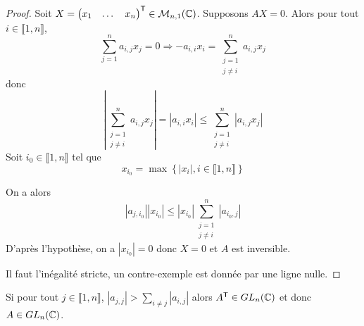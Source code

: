 \begin{proof}
    Soit $X=\begin{pmatrix}
        x_{1}&\dots&x_{n}
    \end{pmatrix}^{\mathsf{T}}\in\mathcal{M}_{n,1}(\mathbb{C})$. Supposons $AX=0$. Alors pour tout $i\in\llbracket1,n\rrbracket$,
    \begin{equation}
        \sum_{j=1}^{n}a_{i,j}x_{j}=0\Rightarrow -a_{i,i}x_{i}=\sum_{\substack{j=1\\j\neq i}}^{n}a_{i,j}x_{j}
    \end{equation}
    donc 
    \begin{equation}
        \left\lvert\sum_{\substack{j=1\\j\neq i}}^{n}a_{i,j}x_{j}\right\rvert=\left\lvert a_{i,i}x_{i}\right\rvert\leqslant\sum_{\substack{j=1\\j\neq i}}^{n}\left\lvert a_{i,j}x_{j}\right\rvert
    \end{equation}
    Soit $i_{0}\in\llbracket1,n\rrbracket$ tel que 
    \begin{equation}
        x_{i_{0}}=\max\left\lbrace\left\lvert x_{i}\right\rvert,i\in\llbracket1,n\rrbracket\right\rbrace
    \end{equation}

    On a alors 
    \begin{equation}
        \left\lvert a_{j,i_{0}}\right\rvert\left\lvert x_{i_{0}}\right\rvert\leqslant \left\lvert x_{i_{0}}\right\rvert\sum_{\substack{j=1\\j\neq i}}^{n}\left\lvert a_{i_{0},j}\right\rvert
    \end{equation}
    D'après l'hypothèse, on a $\left\lvert x_{i_{0}}\right\rvert=0$ donc $X=0$ et $A$ est inversible.

    Il faut l'inégalité stricte, un contre-exemple est donnée par une ligne nulle.
\end{proof}

\begin{remark}
    Si pour tout $j\in\llbracket1,n\rrbracket$, $\left\lvert a_{j,j}\right\rvert>\sum_{i\neq j}\left\lvert a_{i,j}\right\rvert$ alors $A^{\mathsf{T}}\in GL_{n}(\mathbb{C})$ et donc $A\in GL_{n}(\mathbb{C})$.
\end{remark}

